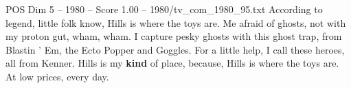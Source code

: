 \begin{textsample}{POS Dim 5 – 1980 – Score 1.00 – 1980/tv\_com\_1980\_95.txt}  \label{ex:f5_pos_008}
According to legend, little folk know, Hills is where the toys are.
Me afraid of ghosts, not with my proton gut, wham, wham.
I capture pesky ghosts with this ghost trap, from Blastin ' Em, the Ecto Popper and Goggles.
For a little help, I call these heroes, all from Kenner.
Hills is my \textbf{kind} of place, because, Hills is where the toys are.
At low prices, every day.

\end{textsample}
